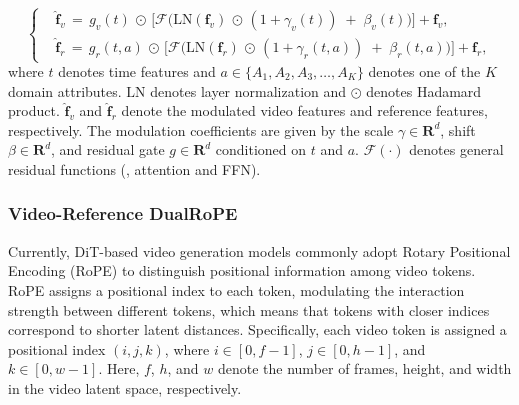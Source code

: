 \begin{equation}
\left\{
\begin{aligned}
& \hat{\boldsymbol{f}}_v \, =  \, g_{v}(t) \,\odot\, \big[ \mathcal{F}\big( \mathrm{LN}( \boldsymbol{f}_v) \,\odot\, (1+\gamma_{v}(t))  \;+\; \beta_{v}(t) \big)\big] + \boldsymbol{f}_v , \\
& \hat{\boldsymbol{f}}_r \, = \, g_{r}(t,a) \,\odot\, \big[ \mathcal{F} \big( \mathrm{LN}( \boldsymbol{f}_r) \,\odot\,  (1+\gamma_{r}(t,a))  \;+\; \beta_{r}(t,a)\big) \big] +\boldsymbol{f}_r  ,
\end{aligned}
\right.
\end{equation}
where $t$ denotes time features and $a \in  \{A_1, A_2, A_3, \ldots, A_K\}$ denotes one of the $K$ domain attributes. $\mathrm{LN}$ denotes layer normalization and  $\odot$ denotes Hadamard product.  $\hat{\boldsymbol{f}}_v$ and $\hat{\boldsymbol{f}}_r$ denote the modulated video features and reference features, respectively. The modulation coefficients are given by the scale $\gamma \in \mathbf{R}^{d}$, shift $\beta \in\mathbf{R}^{d}$, and residual gate $g \in \mathbf{R}^{d}$ conditioned on $t$ and $a$. $\mathcal{F}(\cdot)$ denotes general residual functions (\eg, attention and FFN).




\subsubsection{ Video-Reference DualRoPE}
\label{3.2.2}

Currently, DiT-based video generation models \cite{wan2025wan,yang2024cogvideox} commonly adopt Rotary Positional Encoding (RoPE) to distinguish positional information among video tokens. RoPE assigns a positional index to each token, modulating the interaction strength between different tokens, which means that tokens with closer indices correspond to shorter latent distances. Specifically, each video token is assigned a positional index $(i,j,k)$, where $i\in[0,f-1]$, $j\in[0,h-1]$, and $k\in[0,w-1]$. Here, $f$, $h$, and $w$ denote the number of frames, height, and width in the video latent space, respectively.



